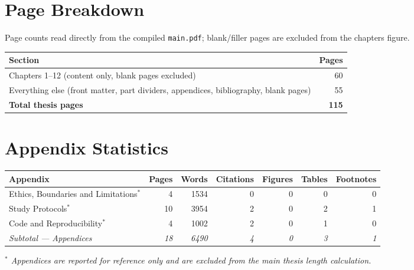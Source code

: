 \documentclass[11pt,a4paper]{article}
\begin{document}
\vspace{1cm}

\section*{Page Breakdown}

\noindent
Page counts read directly from the compiled \texttt{main.pdf}; blank/filler pages are excluded from the chapters figure.

\vspace{0.2cm}

\begin{tabularx}{\textwidth}{Xr}
\toprule
Section & Pages \\
\midrule
Chapters 1--12 (content only, blank pages excluded) & 60 \\
Everything else (front matter, part dividers, appendices, bibliography, blank pages) & 55 \\
\midrule
\textbf{Total thesis pages} & \textbf{115} \\
\bottomrule
\end{tabularx}

\vspace{0.5cm}

\section*{Appendix Statistics}

\begin{tabularx}{\textwidth}{Xrrrrrr}
\toprule
Appendix & Pages & Words & Citations & Figures & Tables & Footnotes \\
\midrule
Ethics, Boundaries and Limitations$^{*}$ & 4 & 1534 & 0 & 0 & 0 & 0 \\
Study Protocols$^{*}$ & 10 & 3954 & 2 & 0 & 2 & 1 \\
Code and Reproducibility$^{*}$ & 4 & 1002 & 2 & 0 & 1 & 0 \\
\midrule
\textit{Subtotal --- Appendices} & \textit{18} & \textit{6490} & \textit{4} & \textit{0} & \textit{3} & \textit{1} \\
\bottomrule
\end{tabularx}

\vspace{0.3cm}

\noindent
\textit{$^{*}$ Appendices are reported for reference only and are excluded from the main thesis length calculation.}

\vspace{0.5cm}
\end{document}
